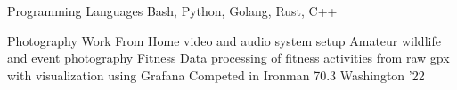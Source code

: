 \begin{cventries}
    \cvskill
    {Programming Languages}
    {Bash, Python, Golang, Rust, C++}
\end{cventries}
\begin{cventries}
	\cvskill
	{Photography}
	{Work From Home video and audio system setup \linebreak Amateur wildlife and event photography}
	\cvskill
	{Fitness}
	{Data processing of fitness activities from raw gpx with visualization using Grafana \linebreak Competed in Ironman 70.3 Washington '22}
\end{cventries}
